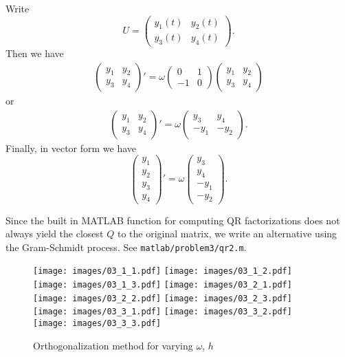 \begin{solution}
  Write 
  \[
    U = 
    \begin{pmatrix}
      y_1(t) & y_2(t) \\
      y_3(t) & y_4(t)
    \end{pmatrix}.
  \]
  Then we have 
  \begin{align*}
    \begin{pmatrix}
      y_1 & y_2 \\
      y_3 & y_4
    \end{pmatrix}' = 
    \omega
    \begin{pmatrix}
      0 & 1 \\
      -1 & 0
    \end{pmatrix}
    \begin{pmatrix}
      y_1 & y_2 \\
      y_3 & y_4
    \end{pmatrix}
  \end{align*}
  or 
  \begin{align*}
    \begin{pmatrix}
      y_1 & y_2 \\
      y_3 & y_4
    \end{pmatrix}' = 
    \omega
    \begin{pmatrix}
      y_3 & y_4 \\
      - y_1 & - y_2 
    \end{pmatrix}.
  \end{align*}
  Finally, in vector form we have
  \[
    \begin{pmatrix}
      y_1 \\ y_2 \\ y_3 \\ y_4
    \end{pmatrix}' = 
    \omega
    \begin{pmatrix}
      y_3 \\ y_4 \\ - y_1 \\ - y_2
    \end{pmatrix}.
  \]
  
  Since the built in MATLAB function for computing QR factorizations does not always yield the closest $Q$ to the original matrix, we write an alternative using the Gram-Schmidt process. See \texttt{matlab/problem3/qr2.m}.
  
  \begin{figure}[h!]
    \centering
    \texttt{[image: images/03\_1\_1.pdf]}
    \texttt{[image: images/03\_1\_2.pdf]}
    \texttt{[image: images/03\_1\_3.pdf]}
    \texttt{[image: images/03\_2\_1.pdf]}
    \texttt{[image: images/03\_2\_2.pdf]}
    \texttt{[image: images/03\_2\_3.pdf]}
    \texttt{[image: images/03\_3\_1.pdf]}
    \texttt{[image: images/03\_3\_2.pdf]}
    \texttt{[image: images/03\_3\_3.pdf]}
    \caption{Orthogonalization method for varying $\omega$, $h$}
    \label{F:03}
  \end{figure}


\end{solution}
